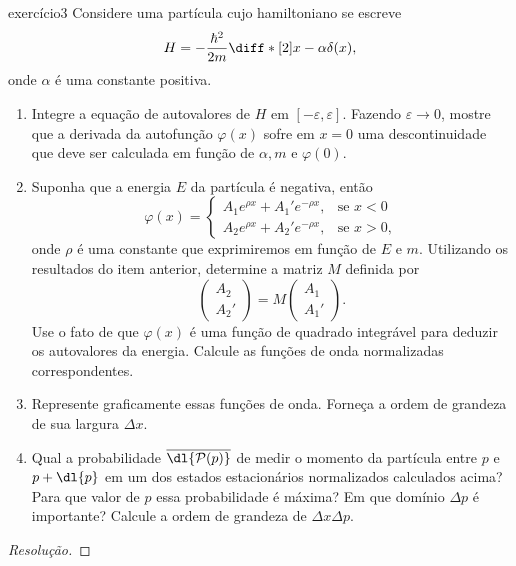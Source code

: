 \begin{exercício}{}{exercício3}
    Considere uma partícula cujo hamiltoniano se escreve
    \begin{equation*}
        H = - \frac{\hbar^2}{2m} \diff*[2]{}{x} - \alpha \delta(x),
    \end{equation*}
    onde \(\alpha\) é uma constante positiva.
    \begin{enumerate}[label=(\alph*)]
        \item Integre a equação de autovalores de \(H\) em \([-\varepsilon, \varepsilon]\). Fazendo \(\varepsilon \to 0\), mostre que a derivada da autofunção \(\varphi(x)\) sofre em \(x = 0\) uma descontinuidade que deve ser calculada em função de \(\alpha, m\) e \(\varphi(0)\).
        \item Suponha que a energia \(E\) da partícula é negativa, então
            \begin{equation*}
                \varphi(x) = \begin{cases}
                    A_1 e^{\rho x} + A_1' e^{-\rho x},&\text{se }x < 0\\
                    A_2 e^{\rho x} + A_2' e^{-\rho x},&\text{se }x > 0,
                \end{cases}
            \end{equation*}
            onde \(\rho\) é uma constante que exprimiremos em função de \(E\) e \(m\). Utilizando os resultados do item anterior, determine a matriz \(M\) definida por
            \begin{equation*}
                \begin{pmatrix}
                    A_2\\
                    A_2'
                \end{pmatrix}=
                M
                \begin{pmatrix}
                    A_1\\
                    A_1'
                \end{pmatrix}.
            \end{equation*}
            Use o fato de que \(\varphi(x)\) é uma função de quadrado integrável para deduzir os autovalores da energia. Calcule as funções de onda normalizadas correspondentes.

        \item Represente graficamente essas funções de onda. Forneça a ordem de grandeza de sua largura \(\Delta x\).
        \item Qual a probabilidade \(\overline{\dl{\mathcal{P}(p)}}\) de medir o momento da partícula entre \(p\) e \(p + \dl{p}\) em um dos estados estacionários normalizados calculados acima? Para que valor de \(p\) essa probabilidade é máxima? Em que domínio \(\Delta p\) é importante? Calcule a ordem de grandeza de \(\Delta x \Delta p\).
    \end{enumerate}
\end{exercício}
\begin{proof}[Resolução]

\end{proof}
